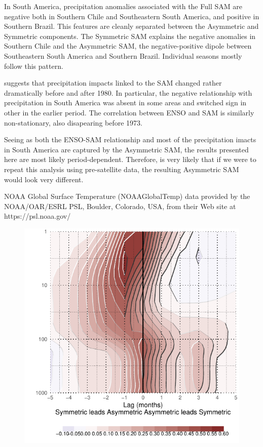 \documentclass[]{ametsocV5}
\begin{document}
In South America, precipitation anomalies associated with the Full SAM
are negative both in Southern Chile and Southeastern South America, and
positive in Southern Brazil. This features are cleanly separated between
the Asymmetric and Symmetric components. The Symmetric SAM explains the
negative anomalies in Southern Chile and the Asymmetric SAM, the
negative-positive dipole between Southeastern South America and Southern
Brazil. Individual seasons mostly follow this pattern.

\citet{silvestri2009} suggests that precipitation impacts linked to the
SAM changed rather dramatically before and after 1980. In particular,
the negative relationship with precipitation in South America was absent
in some areas and switched sign in other in the earlier period. The
correlation between ENSO and SAM is similarly non-stationary, also
disapearing before 1973.

Seeing as both the ENSO-SAM relationship and most of the precipitation
imacts in South America are captured by the Asymmetric SAM, the results
presented here are most likely period-dependent. Therefore, is very
likely that if we were to repeat this analysis using pre-satellite data,
the resulting Asymmetric SAM would look very different.

\acknowledgments

NOAA Global Surface Temperature (NOAAGlobalTemp) data provided by the
NOAA/OAR/ESRL PSL, Boulder, Colorado, USA, from their Web site at
https://psl.noaa.gov/



\newpage

\appendix


\begin{figure}
\includegraphics{A1-1} \label{fig:A1}
\end{figure}
\end{document}
